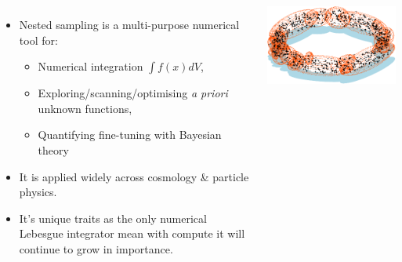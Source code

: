 \documentclass[aspectratio=169]{beamer}
\begin{document}
\begin{frame}
    \vspace{-0.1\textheight}
    \begin{columns}
    \begin{itemize}
        \item Nested sampling is a multi-purpose numerical tool for:
            \begin{itemize}
                \item Numerical integration $\int f(x) dV$,
                \item Exploring/scanning/optimising \textit{a priori} unknown functions,
                \item Quantifying fine-tuning with Bayesian theory
            \end{itemize}
        \item It is applied widely across cosmology \& particle physics.
        \item It's unique traits as the only numerical Lebesgue integrator mean with compute it will continue to grow in importance.
    \end{itemize}
    \includegraphics[width=\textwidth]{figures/multinest}


\end{columns}
\end{frame}
\end{document}
